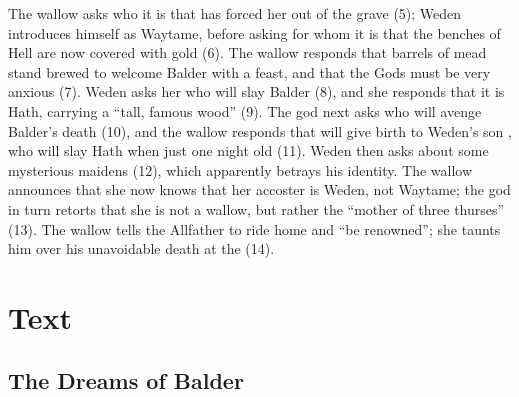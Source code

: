 The wallow asks who it is that has forced her out of the grave (5); Weden introduces himself as Waytame, before asking for whom it is that the benches of Hell are now covered with gold (6).  The wallow responds that barrels of mead stand brewed to welcome Balder with a feast, and that the Gods must be very anxious (7).  Weden asks her who will slay Balder (8), and she responds that it is Hath, carrying a “tall, famous wood” (9).  The god next asks who will avenge Balder’s death (10), and the wallow responds that  will give birth to Weden’s son , who will slay Hath when just one night old (11).  Weden then asks about some mysterious maidens (12), which apparently betrays his identity.  The wallow announces that she now knows that her accoster is Weden, not Waytame; the god in turn retorts that she is not a wallow, but rather the “mother of three thurses” (13).  The wallow tells the Allfather to ride home and “be renowned”; she taunts him over his unavoidable death at the  (14).

\newpage

\section{Text}

\subsection{The Dreams of Balder}

